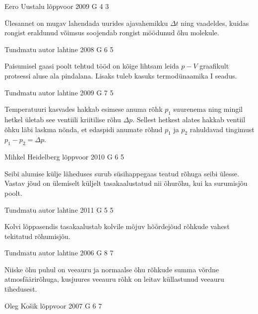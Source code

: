 \documentclass[11pt]{article}
\begin{document}
{%
{Eero Uustalu} %
{lõppvoor} %
{2009} %
{G 4} %
{3} %
{

\ifHint
Ülesannet on mugav lahendada uurides ajavahemikku $\Delta t$ ning vaadeldes, kuidas rongist eraldunud võimsus soojendab rongist möödunud õhu molekule.
\fi
}

{Tundmatu autor} %
{lahtine} %
{2008} %
{G 6} %
{5} %
{

\ifHint
Paisumisel gaasi poolt tehtud tööd on kõige lihtsam leida $p-V$ graafikult protsessi aluse ala pindalana. Lisaks tuleb kasuks termodünaamika I seadus.
\fi
}

{Tundmatu autor} %
{lahtine} %
{2009} %
{G 7} %
{5} %
{

\ifHint
Temperatuuri kasvades hakkab esimese anuma rõhk $p_1$ suurenema ning mingil hetkel ületab see ventiili kriitilise rõhu $\Delta p$. Sellest hetkest alates hakkab ventiil õhku läbi laskma nõnda, et edaspidi anumate rõhud $p_1$ ja $p_2$ rahuldavad tingimust $p_1 - p_2 = \Delta p$.
\fi
}

{Mihkel Heidelberg} %
{lõppvoor} %
{2010} %
{G 6} %
{5} %
{

\ifHint
Seibi alumise külje läheduses surub süsihappegaas teatud rõhuga seibi ülesse. Vastav jõud on ülemiselt küljelt tasakaalustatud nii õhurõhu, kui ka surumisjõu poolt.
\fi
}

{Tundmatu autor} %
{lahtine} %
{2011} %
{G 5} %
{5} %
{

\ifHint
Kolvi lõppasendis tasakaalustab kolvile mõjuv hõõrdejõud rõhkude vahest tekitatud rõhumisjõu.
\fi
}

{Tundmatu autor} %
{lahtine} %
{2006} %
{G 8} %
{7} %
{

\ifHint
Niiske õhu puhul on veeauru ja normaalse õhu rõhkude summa võrdne atmosfäärirõhuga, kusjuures veeauru rõhk on leitav küllastunud veeauru tihedusest.
\fi
}

{Oleg Košik} %
{lõppvoor} %
{2007} %
{G 6} %
{7} %
{

}}
\end{document}
